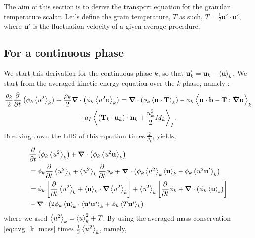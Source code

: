 The aim of this section is to derive the transport equation for the granular temperature scalar. 
Let's define the grain temperature, $T$ as such, $T =\frac{1}{2} \textbf{u}'\cdot\textbf{u}'$, where $\textbf{u}'$ is the fluctuation velocity of a given average procedure. 

\subsection{For a continuous phase}
We start this derivation for the continuous phase $k$, so that $\textbf{u}'_k = \textbf{u}_k - \left<\textbf{u}\right>_k$.
We start from the averaged kinetic energy equation over the $k$ phase, namely : 
\begin{multline*}
    \frac{\rho_k}{2}\frac{\partial }{\partial t}\left(
        \phi_k
        \left<u^2\right>_k
    \right)
    +\frac{\rho_k}{2}\bm{\nabla}\cdot \left(
        \phi_k
        \left<u^2\textbf{u}\right>_k
    \right)
    =
    \bm{\nabla}\cdot\left(
        \phi_k
        \left<\textbf{u}\cdot \textbf{T}\right>_k
    \right)
    +\phi_k\left<\textbf{u}\cdot\textbf{b} - \textbf{T}: \hat{\bm{\nabla}}\textbf{u}\right>_k\\
    +a_I \left<
        (\textbf{T}_k\cdot\textbf{u}_k)\cdot\textbf{n}_k
        + \frac{u^2_k}{2} M_k\right>_I.
\end{multline*}
Breaking down the LHS of this equation times $\frac{2}{\rho_k}$, yields,
\begin{align*}
    &\frac{\partial }{\partial t}\left(
        \phi_k
        \left<u^2\right>_k
    \right)
    +
    \bm{\nabla}\cdot \left(
        \phi_k
        \left<u^2\textbf{u}\right>_k
    \right)\\
    &=
    \phi_k\frac{\partial }{\partial t}\left<u^2\right>_k
    +\left<u^2\right>_k\frac{\partial }{\partial t}\phi_k
    +\bm{\nabla}\cdot \left(
        \phi_k
        \left<u^2\right>_k\left<\textbf{u}\right>_k
        +\phi_k
        \left<u^2\textbf{u}'\right>_k
    \right)\\
    &=
    \phi_k
    \left[
        \frac{\partial }{\partial t}\left<u^2\right>_k
        + 
        \left<\textbf{u}\right>_k
        \cdot\bm{\nabla} 
        \left<u^2\right>_k
    \right]
    +\left<u^2\right>_k \left[
        \frac{\partial }{\partial t}\phi_k
        + \bm{\nabla}\cdot \left(
            \phi_k
            \left<\textbf{u}\right>_k
        \right)
    \right]\\
    &+ \bm{\nabla}\cdot \left(
        2\phi_k
        \left<\textbf{u}\right>_k\cdot\left<\textbf{u'}\textbf{u'}\right>_k + \phi_k \left<T \textbf{u'}\right>_k
    \right)
\end{align*}
where we used $\left<u^2\right>_k = \left<u\right>_k^2 + T$. 
By using the averaged mass conservation \ref{eq:avg_k_mass} times $\frac{1}{2}\left<u^2\right>_k$, namely, 
